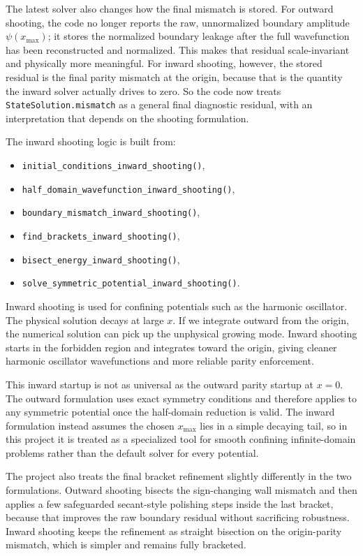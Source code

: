\documentclass[11pt]{article}
\begin{document}
    The latest solver also changes how the final mismatch is stored. For outward shooting, the code no longer reports the raw, unnormalized boundary amplitude $\psi(x_{\max})$; it stores the normalized boundary leakage after the full wavefunction has been reconstructed and normalized. This makes that residual scale-invariant and physically more meaningful. For inward shooting, however, the stored residual is the final parity mismatch at the origin, because that is the quantity the inward solver actually drives to zero. So the code now treats \texttt{StateSolution.mismatch} as a general final diagnostic residual, with an interpretation that depends on the shooting formulation.

    The inward shooting logic is built from:
    \begin{itemize}
        \item \texttt{initial\_conditions\_inward\_shooting()},
        \item \texttt{half\_domain\_wavefunction\_inward\_shooting()},
        \item \texttt{boundary\_mismatch\_inward\_shooting()},
        \item \texttt{find\_brackets\_inward\_shooting()},
        \item \texttt{bisect\_energy\_inward\_shooting()},
        \item \texttt{solve\_symmetric\_potential\_inward\_shooting()}.
    \end{itemize}

    Inward shooting is used for confining potentials such as the harmonic oscillator. The physical solution decays at large $x$. If we integrate outward from the origin, the numerical solution can pick up the unphysical growing mode. Inward shooting starts in the forbidden region and integrates toward the origin, giving cleaner harmonic oscillator wavefunctions and more reliable parity enforcement.

    This inward startup is not as universal as the outward parity startup at $x=0$. The outward formulation uses exact symmetry conditions and therefore applies to any symmetric potential once the half-domain reduction is valid. The inward formulation instead assumes the chosen $x_{\max}$ lies in a simple decaying tail, so in this project it is treated as a specialized tool for smooth confining infinite-domain problems rather than the default solver for every potential.

    The project also treats the final bracket refinement slightly differently in the two formulations. Outward shooting bisects the sign-changing wall mismatch and then applies a few safeguarded secant-style polishing steps inside the last bracket, because that improves the raw boundary residual without sacrificing robustness. Inward shooting keeps the refinement as straight bisection on the origin-parity mismatch, which is simpler and remains fully bracketed.
\end{document}
